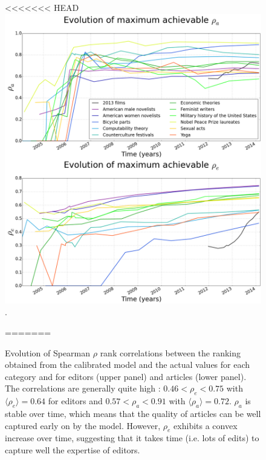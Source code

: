\begin{figure}[!t]
\centering
<<<<<<< HEAD
\includegraphics[width=0.9\columnwidth]{../Figures/rho_combined.png}.
\caption{Evolution of Spearman $\rho$ rank correlations between the ranking obtained from the calibrated model and the actual values for each category and for editors (upper panel)  and articles (lower panel). The correlations are generally quite high : $ 0.46 < \rho_e < 0.75$ with $\langle \rho_e\rangle = 0.64$ for editors and $0.57 < \rho_a < 0.91$ with $\langle \rho_a\rangle = 0.72$. $\rho_{a}$  is stable over time, which means that the quality of articles can be well captured early on by the model. However, $\rho_e$ exhibits a convex increase over time, suggesting that it takes time (i.e. lots of edits) to capture well the expertise of editors.}
\label{fig:rhotime}
=======

\end{figure}
